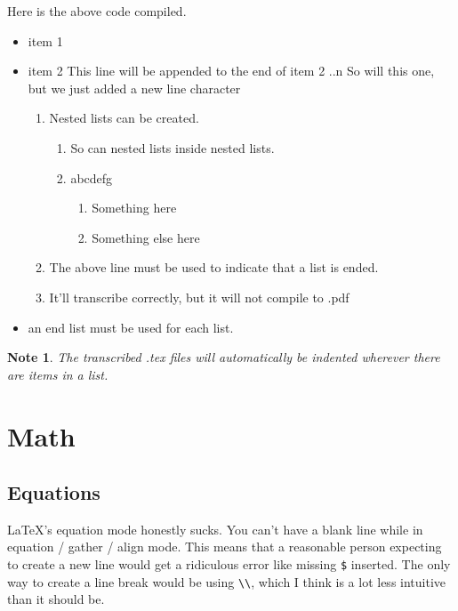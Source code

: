 \documentclass[12pt]{article}
\newtheorem{Note}[Lemma]{Note}
\begin{document}
\begin{flushleft}
Here is the above code compiled. \\
\begin{itemize}[label=--]
    \item item 1
    \item item 2
    This line will be appended to the end of item 2
    ..n So will this one, but we just added a new line character
    \begin{enumerate}[label=\alph*)]
        \item Nested lists can be created.
        \begin{enumerate}[label=(\roman*)]
            \item So can nested lists inside nested lists.
            \item abcdefg
            \begin{enumerate}[label=.\arabic*.]
                \item Something here
                \item Something else here
            \end{enumerate}
        \end{enumerate}
        \item The above line must be used to indicate that a list is ended.
        \item It'll transcribe correctly, but it will not compile to .pdf
    \end{enumerate}
    \item an end list must be used for each list.
\end{itemize}

\begin{Note}
The transcribed .tex files will automatically be indented wherever there are items in a list.
\end{Note}

\newpage

\section*{Math}

\subsection*{Equations}

LaTeX's equation mode honestly sucks. You can't have a blank line while in equation / gather / align mode. This means that a reasonable person expecting to create a new line would get a ridiculous error like missing \verb|$| inserted. The only way to create a line break would be using \verb|\\|, which I think is a lot less intuitive than it should be.


\end{flushleft}
\end{document}
